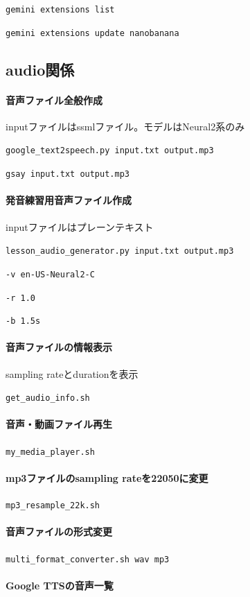 \documentclass[12pt, jafontscale=0.9247]{jlreq}
\begin{document}
\verb*|gemini extensions list|

\verb*|gemini extensions update nanobanana|

\subsection*{audio関係}

\paragraph{音声ファイル全般作成}
inputファイルはssmlファイル。モデルはNeural2系のみ

\verb|google_text2speech.py input.txt output.mp3|

\verb|gsay input.txt output.mp3|

\paragraph{発音練習用音声ファイル作成}
inputファイルはプレーンテキスト

\verb|lesson_audio_generator.py input.txt output.mp3|

\verb|-v en-US-Neural2-C|

\verb|-r 1.0|

\verb|-b 1.5s|

\paragraph{音声ファイルの情報表示}
sampling rateとdurationを表示

\verb|get_audio_info.sh|

\paragraph{音声・動画ファイル再生}
\verb|my_media_player.sh|

\paragraph{mp3ファイルのsampling rateを22050に変更}
\verb|mp3_resample_22k.sh|

\paragraph{音声ファイルの形式変更}
\verb|multi_format_converter.sh wav mp3|

\paragraph{Google TTSの音声一覧}
\end{document}
